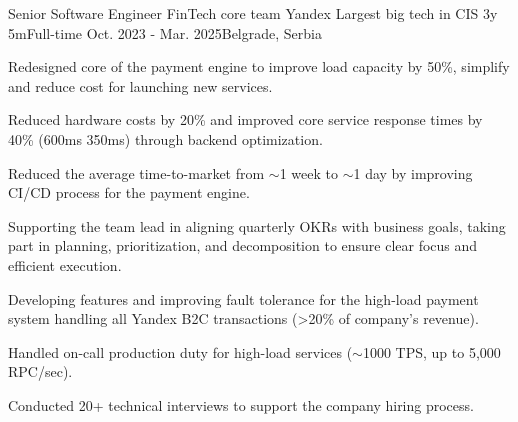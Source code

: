 \begin{cventries}
  \cventry
    {Senior Software Engineer} %
    {FinTech core team} %
    {Yandex} %
    {Largest big tech in CIS} %
    {3y 5m{\enskip\cdotp\enskip}Full-time} %
    {Oct. 2023 - Mar. 2025{\enskip\cdotp\enskip}Belgrade, Serbia} %
    {
      \begin{cvitemstitled} %
        \item {Redesigned core of the payment engine to improve load capacity by 50\%, simplify and reduce cost for launching new services.}
        \item {Reduced hardware costs by 20\% and improved core service response times by 40\% (600ms \rightarrow 350ms) through backend optimization.}
        \item {Reduced the average time-to-market from $\sim$1 week to $\sim$1 day by improving CI/CD process for the payment engine.}
      \end{cvitemstitled}
      \begin{cvitemstitledended}
        \item {Supporting the team lead in aligning quarterly OKRs with business goals, taking part in planning, prioritization, and decomposition to ensure clear focus and efficient execution.}
        \item {Developing features and improving fault tolerance for the high-load payment system handling all Yandex B2C transactions (>20\% of company's revenue).}
        \item {Handled on-call production duty for high-load services ($\sim$1000 TPS, up to 5,000 RPC/sec).}
        \item {Conducted 20+ technical interviews to support the company hiring process.}
      \end{cvitemstitledended}
    }


\end{cventries}
